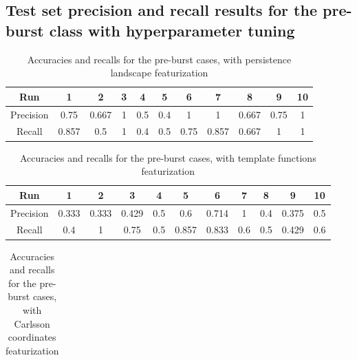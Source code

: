 \documentclass{article}
\begin{document}
\begin{appendix}

\onecolumn
\section{Test set precision and recall results for the pre-burst class with hyperparameter tuning}


\begin{table}[h!]
\caption{Accuracies and recalls for the pre-burst cases, with persistence landscape featurization}                 %
\label{recalls_accuracies_persistencelandscapes}    %
\centering                        %
\begin{tabular}{c|c|c|c|c|c|c|c|c|c|c}

Run&1&2&3&4&5&6&7&8&9&10\\
\hline\hline
Precision&0.75&0.667&1&0.5&0.4&1&1&0.667&0.75&1\\
\hline
Recall&0.857&0.5&1&0.4&0.5&0.75&0.857&0.667&1&1\\

\end{tabular}
\end{table} 

\begin{table}[h!]
\caption{Accuracies and recalls for the pre-burst cases, with template functions featurization}                 %
\label{recalls_accuracies_templatefunctions}    %
\centering                        %
\begin{tabular}{c|c|c|c|c|c|c|c|c|c|c}

Run&1&2&3&4&5&6&7&8&9&10\\
\hline\hline
Precision&0.333&0.333&0.429&0.5&0.6&0.714&1&0.4&0.375&0.5\\
\hline
Recall&0.4&1&0.75&0.5&0.857&0.833&0.6&0.5&0.429&0.6\\

\end{tabular}
\end{table} 

\begin{table}[h!]
\caption{Accuracies and recalls for the pre-burst cases, with Carlsson coordinates featurization}                 %
\label{recalls_accuracies_templatefunctions}    %
\centering                        %
\begin{tabular}{c|c|c|c|c|c|c|c|c|c|c}


\end{tabular}
\end{table}
\end{appendix}
\end{document}

